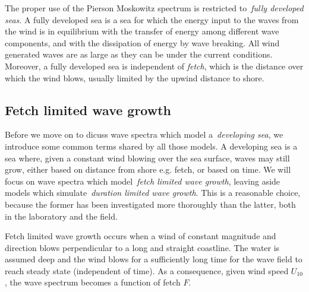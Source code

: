 The proper use of the Pierson Moskowitz spectrum is restricted to~\emph{fully
developed seas}. A fully developed sea is a sea for which the energy input
to the waves from the wind is in equilibrium with the transfer of energy
among different wave components, and with the dissipation of energy by wave 
breaking. All wind generated waves are as large as they can be under the 
current conditions. Moreover, a fully developed sea is independent of 
\emph{fetch}, which is the distance over which the wind blows, usually limited 
by the upwind distance to shore.
%
\subsection{Fetch limited wave growth}
%
Before we move on to dicuss wave spectra which model a~\emph{developing sea}, we 
introduce some common terms shared by all those models. A developing sea is a 
sea where, given a constant wind blowing over the sea surface, waves may still 
grow, either based on distance from shore e.g. fetch, or based on time. We will 
focus on wave spectra which model~\emph{fetch limited wave growth}, leaving 
aside models which simulate~\emph{duration limited wave growth}. This is a 
reasonable choice, because the former has been investigated more thoroughly than
the latter, both in the laboratory and the
field\cite{book:windgeneratedoceanwaves}.

Fetch limited wave growth occurs when a wind of constant magnitude and 
direction blows perpendicular to a long and straight coastline. The water is 
assumed deep and the wind blows for a sufficiently long time for the wave field 
to reach steady state (independent of time). As a consequence, given wind speed 
$U_{10}$, the wave spectrum becomes a function of fetch $F$.

